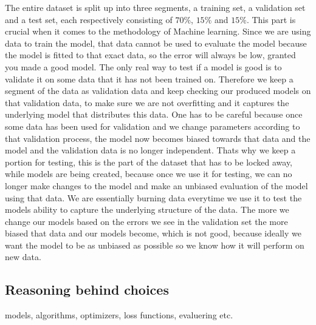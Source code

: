 \documentclass[a4paper,12pt]{article}
\begin{document}
The entire dataset is split up into three segments, a training set, a validation set and a test set, each respectively consisting of $70\%$, $15\%$ and $15\%$. This part is crucial when it comes to the methodology of Machine learning. Since we are using data to train the model, that data cannot be used to evaluate the model because the model is fitted to that exact data, so the error will always be low, granted you made a good model. The only real way to test if a model is good is to validate it on some data that it has not been trained on. Therefore we keep a segment of the data as validation data and keep checking our produced models on that validation data, to make sure we are not overfitting and it captures the underlying model that distributes this data. One has to be careful because once some data has been used for validation and we change parameters according to that validation process, the model now becomes biased towards that data and the model and the validation data is no longer independent. Thats why we keep a portion for testing, this is the part of the dataset that has to be locked away, while models are being created, because once we use it for testing, we can no longer make changes to the model and make an unbiased evaluation of the model using that data. We are essentially burning data everytime we use it to test the models ability to capture the underlying structure of the data. The more we change our models based on the errors we see in the validation set the more biased that data and our models become, which is not good, because ideally we want the model to be as unbiased as possible so we know how it will perform on new data.
\subsection{Reasoning behind choices}
models, algorithms, optimizers, loss functions, evaluering etc.
\end{document}
